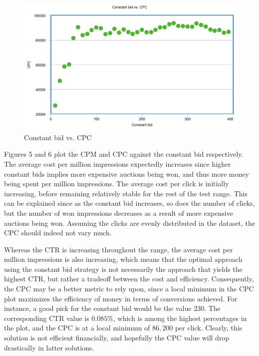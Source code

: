 \documentclass{sig-alternate-05-2015}
\begin{document}
\begin{figure}
  \includegraphics[width=\linewidth]{constant_cpc.png}
  \caption{Constant bid vs. CPC}
  \label{fig:CPM}
\end{figure}

Figures 5 and 6 plot the CPM and CPC against the constant bid respectively. The average cost per million impressions expectedly increases since higher constant bids implies more expensive auctions being won, and thus more money being spent per million impressions. The average cost per click is initially increasing, before remaining relatively stable for the rest of the test range. This can be explained since as the constant bid increases, so does the number of clicks, but the number of won impressions decreases as a result of more expensive auctions being won. Assuming the clicks are evenly distributed in the dataset, the CPC should indeed not vary  much.

Whereas the CTR is increasing throughout the range, the average cost per million impressions is also increasing, which means that the optimal approach using the constant bid strategy is not necessarily the approach that yields the highest CTR, but rather a tradeoff between the cost and efficiency. Consequently, the CPC may be a better metric to rely upon, since a local minimum in the CPC plot maximizes the efficiency of money in terms of conversions achieved. For instance, a good pick for the constant bid would be the value $230$. The corresponding CTR value is $0.085\%$, which is among the highest percentages in the plot, and the CPC is at a local minimum of $86,200$ per click. Clearly, this solution is not efficient financially, and hopefully the CPC value will drop drastically in latter solutions.
\end{document}
